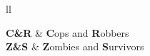 \documentclass[
11pt, %
english, %
singlespacing, %
headsepline, %
]{MastersDoctoralThesis} %
\theoremstyle{definition}
\begin{document}

\tableofcontents %

\listoffigures %

\listoftables %


\begin{abbreviations}{ll} %

\textbf{C\&R} & \textbf{C}ops and \textbf{R}obbers\\
\textbf{Z\&S} & \textbf{Z}ombies and \textbf{S}urvivors\\

\end{abbreviations}








\end{document}
